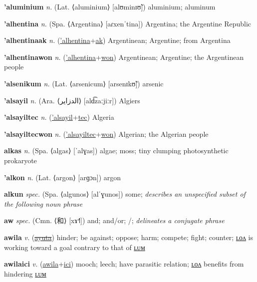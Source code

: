 \textbf{\hypertarget{'aluminium}{'aluminium}} \textit{n.} (Lat. ⟨aluminium⟩ [alʊminɪʊ̃])
aluminium; aluminum

\textbf{\hypertarget{'alhentina}{'alhentina}} \textit{n.} (Spa. ⟨Argentina⟩ [aɾxenˈtina])
Argentina; the Argentine Republic

\textbf{\hypertarget{'alhentinaak}{'alhentinaak}} \textit{n.} (\hyperlink{'alhentina}{'alhentina}+\allowbreak \hyperlink{ak}{ak})
Argentinean; Argentine; from Argentina

\textbf{\hypertarget{'alhentinawon}{'alhentinawon}} \textit{n.} (\hyperlink{'alhentina}{'alhentina}+\allowbreak \hyperlink{won}{won})
Argentinean; Argentine; the Argentinean people

\textbf{\hypertarget{'alsenikum}{'alsenikum}} \textit{n.} (Lat. ⟨arsenicum⟩ [arsenɪkʊ̃])
arsenic

\textbf{\hypertarget{'alsayil}{'alsayil}} \textit{n.} (Ara. ⟨{\arabics{}الدزاير}⟩ [ald͡zaːjiːr])
Algiers

\textbf{\hypertarget{'alsayiltec}{'alsayiltec}} \textit{n.} (\hyperlink{'alsayil}{'alsayil}+\allowbreak \hyperlink{tec}{tec})
Algeria

\textbf{\hypertarget{'alsayiltecwon}{'alsayiltecwon}} \textit{n.} (\hyperlink{'alsayiltec}{'alsayiltec}+\allowbreak \hyperlink{won}{won})
Algerian; the Algerian people

\textbf{\hypertarget{alkas}{alkas}} \textit{n.} (Spa. ⟨algas⟩ [ˈalɣas])
algae; moss; tiny clumping photosynthetic prokaryote

\textbf{\hypertarget{'alkon}{'alkon}} \textit{n.} (Lat. ⟨argon⟩ [arɡɔn])
argon

\textbf{\hypertarget{alkun}{alkun}} \textit{spec.} (Spa. ⟨algunos⟩ [alˈɣunos])
some; \textit{describes an unspecified subset of the following noun phrase}

\textbf{\hypertarget{aw}{aw}} \textit{spec.} (Cmn. ⟨{\chinese{}和}⟩ [xɤ˧˥])
and; and/or; /; \textit{delineates a conjugate phrase}

\textbf{\hypertarget{awila}{awila}} \textit{v.} (\hyperlink{ayuta}{\sout{ayuta}})
hinder; be against; oppose; harm; compete; fight; counter; \hyperlink{awilalon}{ʟᴏᴧ} is working toward a goal contrary to that of \hyperlink{awilalum}{ʟᴜᴍ}

\textbf{\hypertarget{awilaici}{awilaici}} \textit{v.} (\hyperlink{awila}{awila}+\allowbreak \hyperlink{ici}{ici})
mooch; leech; have parasitic relation; \hyperlink{awilaicilon}{ʟᴏᴧ} benefits from hindering \hyperlink{awilaicilum}{ʟᴜᴍ}

